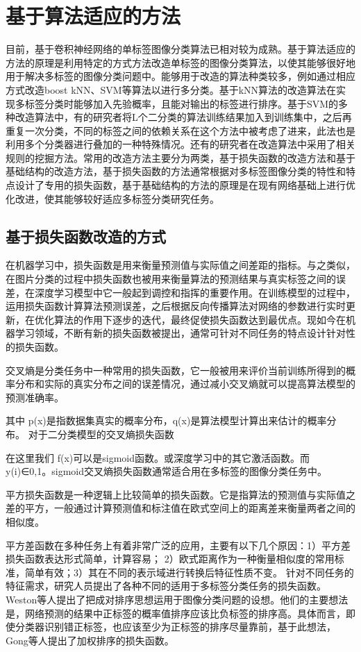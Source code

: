 \section{基于算法适应的方法}
目前，基于卷积神经网络的单标签图像分类算法已相对较为成熟。基于算法适应的方法的原理是利用特定的方式方法改造单标签的图像分类算法，以使其能够很好地用于解决多标签的图像分类问题中。能够用于改造的算法种类较多，例如通过相应方式改造boost kNN、SVM等算法以进行多分类。基于kNN算法的改造算法在实现多标签分类时能够加入先验概率，且能对输出的标签进行排序。基于SVM的多种改造算法中，有的研究者将L个二分类的算法训练结果加入到训练集中，之后再重复一次分类，不同的标签之间的依赖关系在这个方法中被考虑了进来，此法也是利用多个分类器进行叠加的一种特殊情况。还有的研究者在改造算法中采用了相关规则的挖掘方法。常用的改造方法主要分为两类，基于损失函数的改造方法和基于基础结构的改造方法，基于损失函数的方法通常根据对多标签图像分类的特性和特点设计了专用的损失函数，基于基础结构的方法的原理是在现有网络基础上进行优化改进，使其能够较好适应多标签分类研究任务。

\subsection{基于损失函数改造的方式}
在机器学习中，损失函数是用来衡量预测值与实际值之间差距的指标。与之类似，在图片分类的过程中损失函数也被用来衡量算法的预测结果与真实标签之间的误差，在深度学习模型中它一般起到调控和指挥的重要作用。在训练模型的过程中，运用损失函数计算算法预测误差，之后根据反向传播算法对网络的参数进行实时更新，在优化算法的作用下逐步的迭代，最终促使损失函数达到最优点。现如今在机器学习领域，不断有新的损失函数被提出，通常可针对不同任务的特点设计针对性的损失函数。

交叉熵是分类任务中一种常用的损失函数，它一般被用来评价当前训练所得到的概率分布和实际的真实分布之间的误差情况，通过减小交叉熵就可以提高算法模型的预测准确率。

其中 p(x)是指数据集真实的概率分布，q(x)是算法模型计算出来估计的概率分布。
对于二分类模型的交叉熵损失函数

在这里我们 f(x)可以是sigmoid函数。或深度学习中的其它激活函数。而 y(i)∈0,1。sigmoid交叉熵损失函数通常适合用在多标签的图像分类任务中。

平方损失函数是一种逻辑上比较简单的损失函数。它是指算法的预测值与实际值之差的平方，一般通过计算预测值和标注值在欧式空间上的距离差来衡量两者之间的相似度。

平方差函数在多种任务上有着非常广泛的应用，主要有以下几个原因：1）平方差损失函数表达形式简单，计算容易； 2）欧式距离作为一种衡量相似度的常用标准，简单有效；3）其在不同的表示域进行转换后特征性质不变。
针对不同任务的特征需求，研究人员提出了各种不同的适用于多标签分类任务的损失函数。Weston等人提出了把成对排序思想运用于图像分类问题的设想。他们的主要想法是，网络预测的结果中正标签的概率值排序应该比负标签的排序高。具体而言，即使分类器识别错正标签，也应该至少为正标签的排序尽量靠前，基于此想法，Gong等人提出了加权排序的损失函数。

